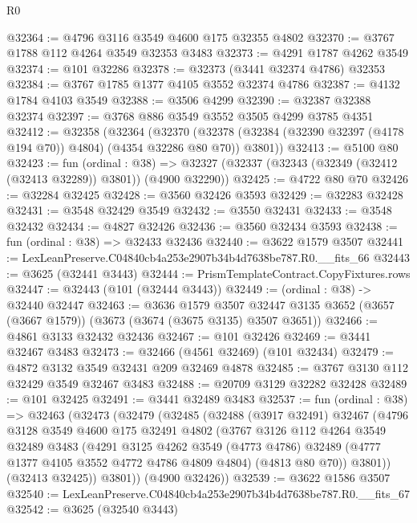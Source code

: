 \begin{lexlean}{R0}
\begin{coremodule}
@32364 := @4796 @3116 @3549 @4600 @175 @32355 @4802
@32370 := @3767 @1788 @112 @4264 @3549 @32353 @3483
@32373 := @4291 @1787 @4262 @3549
@32374 := @101 @32286
@32378 := @32373 (@3441 @32374 @4786) @32353
@32384 := @3767 @1785 @1377 @4105 @3552 @32374 @4786
@32387 := @4132 @1784 @4103 @3549
@32388 := @3506 @4299
@32390 := @32387 @32388 @32374
@32397 := @3768 @886 @3549 @3552 @3505 @4299 @3785 @4351
@32412 := @32358
    (@32364
      (@32370
        (@32378 (@32384 (@32390 @32397 (@4178 @194 @70)) @4804) (@4354 @32286 @80 @70))
        @3801))
@32413 := @5100 @80
@32423 := fun (ordinal : @38) =>
  @32327 (@32337 (@32343 (@32349 (@32412 (@32413 @32289)) @3801)) (@4900 @32290))
@32425 := @4722 @80 @70
@32426 := @32284 @32425
@32428 := @3560 @32426 @3593
@32429 := @32283 @32428
@32431 := @3548 @32429 @3549
@32432 := @3550 @32431
@32433 := @3548 @32432
@32434 := @4827 @32426
@32436 := @3560 @32434 @3593
@32438 := fun (ordinal : @38) => @32433 @32436
@32440 := @3622 @1579 @3507
@32441 := LexLeanPreserve.C04840cb4a253e2907b34b4d7638be787.R0.__fits_66
@32443 := @3625 (@32441 @3443)
@32444 := PrismTemplateContract.CopyFixtures.rows
@32447 := @32443 (@101 (@32444 @3443))
@32449 := (ordinal : @38) -> @32440 @32447
@32463 := @3636
    @1579
    @3507
    @32447
    @3135
    @3652
    (@3657 (@3667 @1579))
    (@3673 (@3674 (@3675 @3135) @3507 @3651))
@32466 := @4861 @3133 @32432 @32436
@32467 := @101 @32426
@32469 := @3441 @32467 @3483
@32473 := @32466 (@4561 @32469) (@101 @32434)
@32479 := @4872 @3132 @3549 @32431 @209 @32469 @4878
@32485 := @3767 @3130 @112 @32429 @3549 @32467 @3483
@32488 := @20709 @3129 @32282 @32428
@32489 := @101 @32425
@32491 := @3441 @32489 @3483
@32537 := fun (ordinal : @38) =>
  @32463
    (@32473
      (@32479
        (@32485
          (@32488
            (@3917 @32491)
            @32467
            (@4796
              @3128
              @3549
              @4600
              @175
              @32491
              @4802
              (@3767
                @3126
                @112
                @4264
                @3549
                @32489
                @3483
                (@4291
                  @3125
                  @4262
                  @3549
                  (@4773 @4786)
                  @32489
                  (@4777 @1377 @4105 @3552 @4772 @4786 @4809 @4804)
                  (@4813 @80 @70))
                @3801))
            (@32413 @32425))
          @3801))
      (@4900 @32426))
@32539 := @3622 @1586 @3507
@32540 := LexLeanPreserve.C04840cb4a253e2907b34b4d7638be787.R0.__fits_67
@32542 := @3625 (@32540 @3443)

\end{coremodule}
\end{lexlean}
